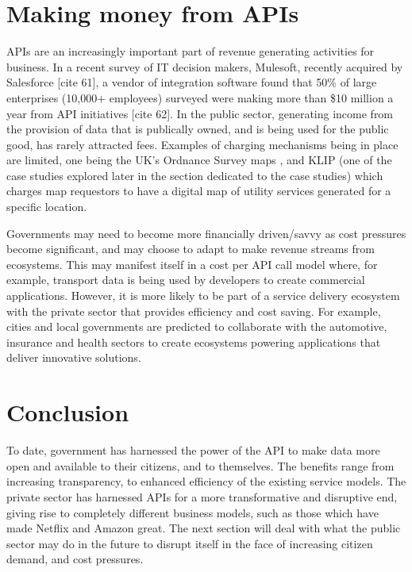 \section{Making money from APIs}

APIs are an increasingly important part of revenue generating activities for
business. In a recent survey of IT decision makers, Mulesoft, recently acquired
by Salesforce [cite 61], a vendor of integration software found that 50\% of
large enterprises (10,000+ employees) surveyed were making more than \$10 million
a year from API initiatives [cite 62]. In the public sector, generating income
from the provision of data that is publically owned, and is being used for the
public good, has rarely attracted fees. Examples of charging mechanisms being in
place are limited, one being the UK’s Ordnance Survey maps , and KLIP (one of the
case studies explored later in the section dedicated to the case studies) which
charges map requestors to have a digital map of utility services generated for
a specific location.

Governments may need to become more financially driven/savvy as cost pressures
become significant, and may choose to adapt to make revenue streams from ecosystems.
This may manifest itself in a cost per API call model where, for example, transport
data is being used by developers to create commercial applications. However, it is
more likely to be part of a service delivery ecosystem with the private sector that
provides efficiency and cost saving. For example, cities and local governments are
predicted to collaborate with the automotive, insurance and health sectors to create ecosystems powering applications that deliver
innovative solutions.

\section{Conclusion}

To date, government has harnessed the power of the API to make data more open and
available to their citizens, and to themselves. The benefits range from increasing transparency, to enhanced efficiency of the existing service models. The private
sector has harnessed APIs for a more transformative and disruptive end, giving rise
to completely different business models, such as those which have made Netflix and
Amazon great. The next section will deal with what the public sector may do in the
future to disrupt itself in the face of increasing citizen demand, and cost pressures.	
